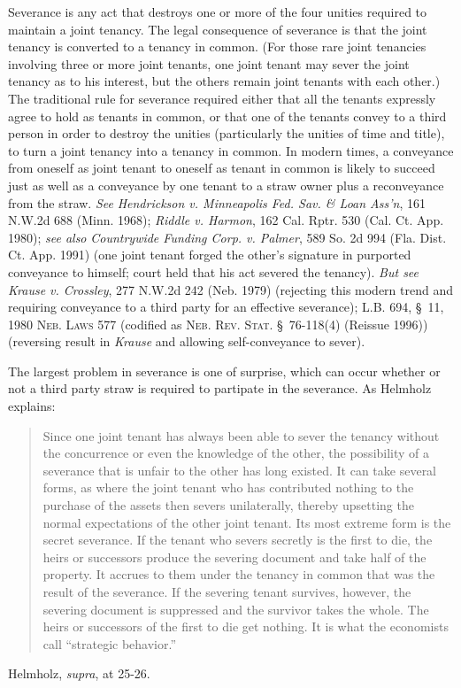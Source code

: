 Severance is any act that destroys one or more of the four unities required to
maintain a joint tenancy. The legal consequence of severance is that the joint
tenancy is converted to a tenancy in common. (For those rare joint tenancies
involving three or more joint tenants, one joint tenant may sever the joint
tenancy as to his interest, but the others remain joint tenants with each
other.) The traditional rule for severance required either that all the tenants
expressly agree to hold as tenants in common, or that one of the tenants convey
to a third person in order to destroy the unities (particularly the unities of
time and title), to turn a joint tenancy into a tenancy in common. In modern
times, a conveyance from oneself as joint tenant to oneself as tenant in common
is likely to succeed just as well as a conveyance by one tenant to a straw owner
plus a reconveyance from the straw. \textit{See} \emph{Hendrickson v.
Minneapolis Fed. Sav. \& Loan Ass'n}, 161 N.W.2d 688 (Minn. 1968); \emph{Riddle
v. Harmon}, 162 Cal. Rptr. 530 (Cal. Ct. App. 1980); \textit{see also}
\emph{Countrywide Funding Corp. v. Palmer}, 589 So. 2d 994 (Fla. Dist. Ct. App.
1991) (one joint tenant forged the other's signature in purported conveyance to
himself; court held that his act severed the tenancy). \textit{But see}
\emph{Krause v. Crossley}, 277 N.W.2d 242 (Neb. 1979) (rejecting this modern
trend and requiring conveyance to a third party for an effective severance);
L.B. 694, \S~11, 1980 \textsc{Neb. Laws} 577 (codified as \textsc{Neb. Rev.
Stat.} \S~76-118(4) (Reissue 1996)) (reversing result in \textit{Krause} and
allowing self-conveyance to sever).

The largest problem in severance is one of surprise, which can occur whether or
not a third party straw is required to partipate in the severance. As Helmholz
explains:
\begin{quote}
Since one joint tenant has always been able to sever the tenancy without the
concurrence or even the knowledge of the other, the possibility of a severance
that is unfair to the other has long existed. It can take several forms, as
where the joint tenant who has contributed nothing to the purchase of the
assets then severs unilaterally, thereby upsetting the normal expectations of
the other joint tenant. Its most extreme form is the secret severance. If the
tenant who severs secretly is the first to die, the heirs or successors produce
the severing document and take half of the property. It accrues to them under
the tenancy in common that was the result of the severance. If the severing
tenant survives, however, the severing document is suppressed and the survivor
takes the whole. The heirs or successors of the first to die get nothing. It is
what the economists call ``strategic behavior.''
\end{quote}
Helmholz, \textit{supra}, at 25-26.

